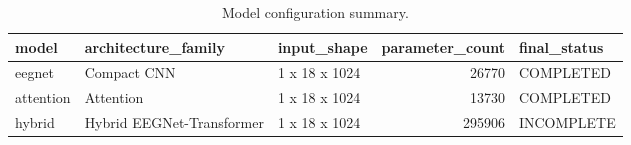 \begin{table}
\caption{Model configuration summary.}
\label{tab:model_configuration_table}
\begin{tabular}{lllrl}
\toprule
model & architecture\_family & input\_shape & parameter\_count & final\_status \\
\midrule
eegnet & Compact CNN & 1 x 18 x 1024 & 26770 & COMPLETED \\
attention & Attention & 1 x 18 x 1024 & 13730 & COMPLETED \\
hybrid & Hybrid EEGNet-Transformer & 1 x 18 x 1024 & 295906 & INCOMPLETE \\
\bottomrule
\end{tabular}
\end{table}
